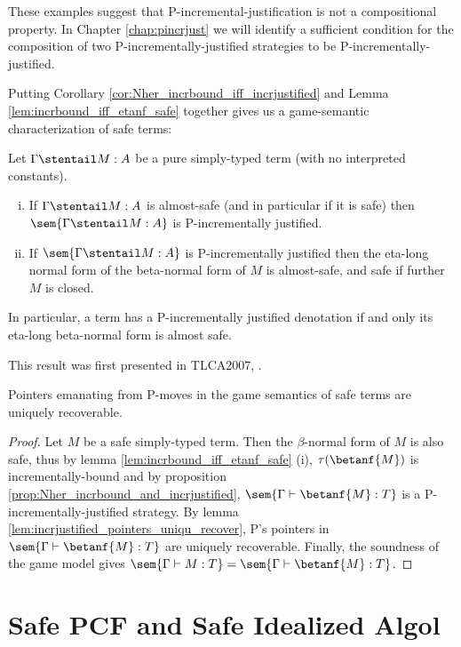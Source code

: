 These examples suggest that P-incremental-justification is not a
compositional property. In Chapter \ref{chap:pincrjust} we will
identify a sufficient condition for the composition of
two P-incrementally-justified strategies to be
P-incrementally-justified. \smallskip


Putting Corollary \ref{cor:Nher_incrbound_iff_incrjustified} and
Lemma \ref{lem:incrbound_iff_etanf_safe} together gives us a
game-semantic characterization of safe terms:
\begin{theorem}
\label{thm:safeincrejust} Let $\Gamma \stentail M : A$ be a pure simply-typed term
(with no interpreted constants).
\begin{enumerate}[(i)]
\item If $\Gamma \stentail M : A$ is almost-safe (and in particular if it is safe) then $\sem{\Gamma \stentail M : A}$
is P-incrementally justified.
\item If $\sem{\Gamma \stentail M : A}$ is
  P-incrementally justified then the eta-long normal form of the beta-normal form of $M$ is
almost-safe, and safe if further $M$ is closed.
\end{enumerate}
\end{theorem}
In particular, a term has a P-incrementally justified denotation if and only
its eta-long beta-normal form is almost safe.

This result was first presented in TLCA2007, \cite[Theorem 3(ii)]{blumong:safelambdacalculus}.


\begin{corollary}
\label{cor:safe_ptr_recoverable} Pointers emanating from P-moves in the game semantics of
safe terms are uniquely recoverable.
\end{corollary}
\begin{proof}
Let $M$ be a safe simply-typed term. Then the $\beta$-normal form of
$M$ is also safe, thus by lemma \ref{lem:incrbound_iff_etanf_safe}
(i), $\tau(\betanf{M})$ is incrementally-bound and by proposition
\ref{prop:Nher_incrbound_and_incrjustified}, $\sem{\Gamma \vdash
\betanf{M} :T}$ is a P-incrementally-justified strategy. By lemma
\ref{lem:incrjustified_pointers_uniqu_recover}, P's pointers in
$\sem{\Gamma \vdash \betanf{M} :T}$ are uniquely recoverable.
Finally, the soundness of the game model gives $\sem{\Gamma \vdash
M:T} = \sem{\Gamma \vdash \betanf{M} : T}$.
\end{proof}


\section{Safe PCF and Safe Idealized Algol}

